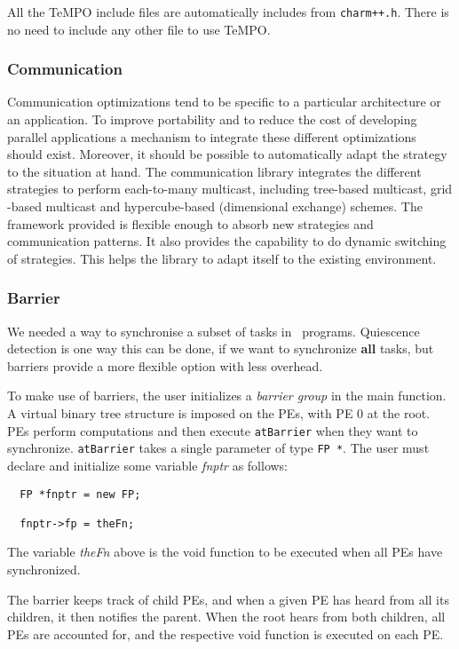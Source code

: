 All the TeMPO include files are automatically includes from {\tt charm++.h}.
There is no need to include any other file to use TeMPO.

\subsubsection{Communication}
Communication optimizations tend to be specific to a particular
architecture or an application. To improve portability and to reduce the
cost of developing parallel applications a mechanism to integrate these
different optimizations should exist. Moreover, it should be possible to
automatically adapt the strategy to the situation at hand. The
communication library integrates the different strategies to perform
each-to-many multicast, including tree-based multicast, grid -based
multicast and hypercube-based (dimensional exchange) schemes. The
framework provided is flexible enough to absorb new strategies and
communication patterns. It also provides the capability to do dynamic
switching of strategies. This helps the library to adapt itself to the
existing environment.

\subsubsection{Barrier}
We needed a way to synchronise a subset of tasks in \charmpp\
programs. Quiescence detection is one way this can be done, if we want
to synchronize {\bf all} tasks, but barriers provide a more flexible
option with less overhead. 

To make use of barriers, the user initializes a {\sl barrier group} in
the main function. A virtual binary tree structure is imposed on the
PEs, with PE 0 at the root.  PEs perform computations and then execute
{\tt atBarrier} when they want to synchronize.  {\tt atBarrier} takes
a single parameter of type {\tt FP *}.  The user must declare and
initialize some variable {\it fnptr} as follows:

\begin{verbatim}
  FP *fnptr = new FP;

  fnptr->fp = theFn;
\end{verbatim}

The variable {\it theFn} above is the void function to be executed when all
PEs have synchronized.

The barrier keeps track of child PEs, and when a given PE has heard
from all its children, it then notifies the parent.  When the root
hears from both children, all PEs are accounted for, and the
respective void function is executed on each PE. 


